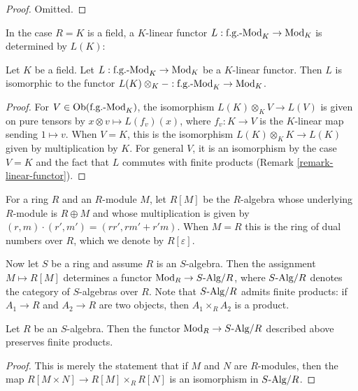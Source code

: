 \begin{proof}
Omitted.
\end{proof}

\noindent
In the case $R = K$ is a field, a $K$-linear functor $L: 
\textnormal{f.g.-Mod}_{K} \rightarrow \textnormal{Mod}_{K}$ is determined by 
$L(K)$:

\begin{lemma}
\label{lemma-linear-functor-over-field}
Let $K$ be a field. Let $L: \textnormal{f.g.-Mod}_{K} \rightarrow 
\textnormal{Mod}_{K}$ be a $K$-linear functor.  Then $L$ is isomorphic to the 
functor $L(K) \otimes_{K} - : \textnormal{f.g.-Mod}_{K} \rightarrow 
\textnormal{Mod}_{K}$.
\end{lemma}

\begin{proof}
For $V \in \textnormal{Ob}(\textnormal{f.g.-Mod}_{K})$, the isomorphism $L(K) 
\otimes_{K} V \rightarrow L(V)$ is given on pure tensors by $x \otimes v 
\mapsto L(f_{v})(x)$, where $f_{v}: K \rightarrow V$ is the $K$-linear map 
sending $1 \mapsto v$.  When $V = K$, this is the isomorphism $L(K) \otimes_{K} 
K \rightarrow L(K)$ given by multiplication by $K$.  For general $V$, it is an 
isomorphism by the case $V = K$ and the fact that $L$ commutes with finite 
products (Remark \ref{remark-linear-functor}).
\end{proof}

\noindent 
For a ring $R$ and an $R$-module $M$, let $R[M]$ be the $R$-algebra whose 
underlying $R$-module is $R \oplus M$ and whose multiplication is given by 
$(r,m) \cdot (r',m') = (rr', rm' + r'm)$.  When $M = R$ this is the ring of 
dual numbers over $R$, which we denote by $R[\varepsilon]$.  

\medskip \noindent
Now let $S$ be a ring and assume $R$ is an $S$-algebra.  Then the assignment $M 
\mapsto R[M]$ determines a functor $\textnormal{Mod}_{R} \rightarrow S 
\textnormal{-Alg}/R$, where $S \textnormal{-Alg}/R$ denotes the category of 
$S$-algebras over $R$.  Note that $S \textnormal{-Alg}/R$ admits finite 
products: if $A_1 \rightarrow R$ and $A_2 \rightarrow R$ are two objects, then 
$A_1 \times_{R} A_2$ is a product.

\begin{lemma}
\label{lemma-preserves-products}
Let $R$ be an $S$-algebra. Then the functor $\textnormal{Mod}_{R} \rightarrow S 
\textnormal{-Alg}/R$ described above preserves finite products.
\end{lemma}

\begin{proof}
This is merely the statement that if $M$ and $N$ are $R$-modules, then the map 
$R[M \times N] \rightarrow R[M] \times_{R} R[N]$ is an isomorphism in $S 
\textnormal{-Alg}/R$.
\end{proof}

